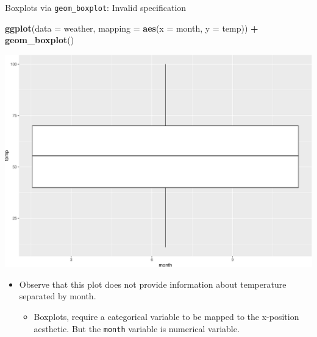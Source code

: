 \documentclass[
  ignorenonframetext,
]{beamer}
\newenvironment{Shaded}{\begin{snugshade}}{\end{snugshade}}
\newcommand{\AttributeTok}[1]{\textcolor[rgb]{0.13,0.29,0.53}{#1}}
\newcommand{\FunctionTok}[1]{\textcolor[rgb]{0.13,0.29,0.53}{\textbf{#1}}}
\newcommand{\NormalTok}[1]{#1}
\newcommand{\SpecialCharTok}[1]{\textcolor[rgb]{0.81,0.36,0.00}{\textbf{#1}}}
\providecommand{\tightlist}{%
  \setlength{\itemsep}{0pt}\setlength{\parskip}{0pt}}
\begin{document}
\begin{frame}[fragile]{Boxplots via \texttt{geom\_boxplot}: Invalid
specification}
\protect\hypertarget{boxplots-via-geom_boxplot-invalid-specification}{}
\tiny

\begin{Shaded}
\begin{Highlighting}[]
\FunctionTok{ggplot}\NormalTok{(}\AttributeTok{data =}\NormalTok{ weather, }\AttributeTok{mapping =} \FunctionTok{aes}\NormalTok{(}\AttributeTok{x =}\NormalTok{ month, }\AttributeTok{y =}\NormalTok{ temp)) }\SpecialCharTok{+}
  \FunctionTok{geom\_boxplot}\NormalTok{()}
\end{Highlighting}
\end{Shaded}

\begin{center}\includegraphics[width=0.4\linewidth,height=0.5\textheight]{Week2_files/figure-beamer/unnamed-chunk-34-1} \end{center}
\normalsize

\begin{itemize}
\item
  Observe that this plot does not provide information about temperature
  separated by month.

  \begin{itemize}
  \tightlist
  \item
    Boxplots, require a categorical variable to be mapped to the
    x-position aesthetic. But the \texttt{month} variable is numerical
    variable.
  \end{itemize}
\end{itemize}
\end{frame}
\end{document}
